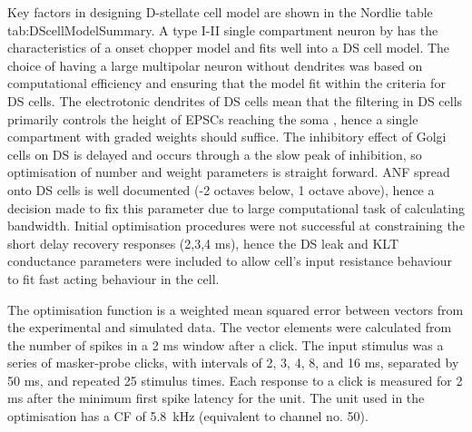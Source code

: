 \medskip{}

Key factors in designing D-stellate cell model are shown in the Nordlie table
{tab:DScellModelSummary}. A type I-II single compartment neuron by
\citet{RothmanManis:2003b} has the characteristics of a onset chopper model and
fits well into a DS cell model. The choice of having a large multipolar neuron
without dendrites was based on computational efficiency and ensuring that the
model fit within the criteria for DS cells. The electrotonic dendrites of DS
cells mean that the filtering in DS cells primarily controls the height of EPSCs
reaching the soma \citep{WhiteYoungEtAl:1994}, hence a single compartment with
graded weights should suffice. The inhibitory effect of Golgi cells on DS is
delayed and occurs through a the slow peak of \GABAa inhibition, so optimisation
of number and weight parameters is straight forward. ANF spread onto DS cells is
well documented (-2 octaves below, 1 octave above), hence a decision made to fix
this parameter due to large computational task of calculating bandwidth. Initial
optimisation procedures were not successful at constraining the short delay
recovery responses (2,3,4 ms), hence the DS leak and KLT conductance parameters
were included to allow cell's input resistance behaviour to fit fast acting
behaviour in the cell.


\medskip{}


The optimisation function is a weighted mean squared error between vectors from
the experimental and simulated data. The vector elements were calculated from
the number of spikes in a 2 ms window after a click.  The input stimulus was a
series of masker-probe clicks, with intervals of 2, 3, 4, 8, and 16 ms,
separated by 50 ms, and repeated 25 stimulus times. Each response to a click is
measured for 2 ms after the minimum first spike latency for the unit.  The unit
used in the optimisation has a CF of 5.8~kHz (equivalent to channel no. 50).







